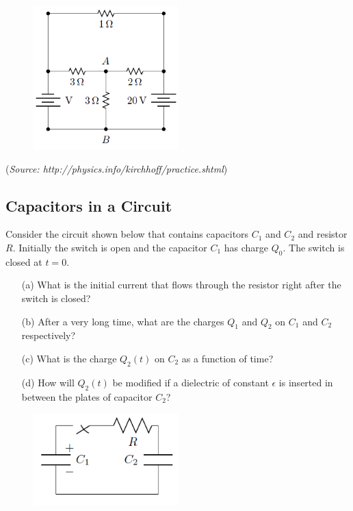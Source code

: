\documentclass{article}
\begin{document}
\begin{figure}[h]
	\begin{center}
		\includegraphics[width=0.5\textwidth]{PracticeCircuit.png}
	\end{center}
\end{figure}

(\textit{Source: http://physics.info/kirchhoff/practice.shtml})

\subsection{Capacitors in a Circuit}

Consider the circuit shown below that contains capacitors $C_1$ and $C_2$ and resistor $R$. Initially the switch is open and the capacitor $C_1$ has charge $Q_0$. The switch is closed at $t=0$.
\begin{itemize}
	\item[(a)] What is the initial current that flows through the resistor right after the switch is closed?
	\item[(b)] After a very long time, what are the charges $Q_1$ and $Q_2$ on $C_1$ and $C_2$ respectively?
	\item[(c)] What is the charge $Q_2(t)$ on $C_2$ as a function of time?
	\item[(d)] How will $Q_2(t)$ be modified if a dielectric of constant $\epsilon$ is inserted in between the plates of capacitor $C_2$?
\end{itemize}

\begin{figure}[h]
	\begin{center}
		\includegraphics[width=0.5\textwidth]{CapacitorCircuit.png}
	\end{center}
\end{figure}
\end{document}
